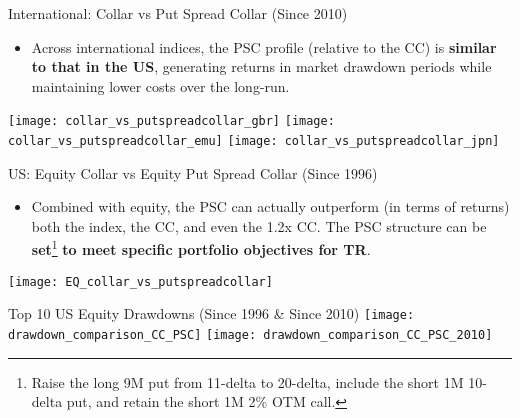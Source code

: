 \documentclass{beamer}
\begin{document}
\begin{frame}{International: Collar vs Put Spread Collar (Since 2010)}
\begin{itemize}
\item Across international indices, the PSC profile (relative to the CC) is {\bf similar to that in the US}, generating returns in market drawdown periods while maintaining lower costs over the long-run.
\end{itemize}
\texttt{[image: collar\_vs\_putspreadcollar\_gbr]}
\texttt{[image: collar\_vs\_putspreadcollar\_emu]}
\texttt{[image: collar\_vs\_putspreadcollar\_jpn]}
\end{frame}

\begin{frame}{\Large US: Equity Collar vs Equity Put Spread Collar (Since 1996)}
\begin{itemize}
\item Combined with equity, the PSC can actually outperform (in terms of returns) both the index, the CC, and even the 1.2x CC. The PSC structure can be {\bf set}\footnote{\tiny Raise the long 9M put from 11-delta to 20-delta, include the short 1M 10-delta put, and retain the short 1M 2\% OTM call. } {\bf to meet specific portfolio objectives for TR}.
\end{itemize}
\texttt{[image: EQ\_collar\_vs\_putspreadcollar]}
\end{frame}

\begin{frame}{Top 10 US Equity Drawdowns (Since 1996 \& Since 2010)}
\texttt{[image: drawdown\_comparison\_CC\_PSC]}
\texttt{[image: drawdown\_comparison\_CC\_PSC\_2010]}
\end{frame}
\end{document}

